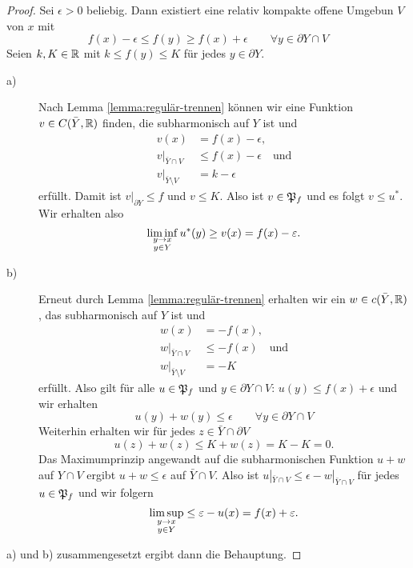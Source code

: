 \begin{proof}
  Sei $\epsilon > 0$ beliebig. Dann existiert eine relativ kompakte offene
  Umgebun $V$ von $x$ mit
  \[
  f(x) - \epsilon \leq f(y) \geq f(x) + \epsilon \qquad \forall y
  \in \partial Y \cap V
  \]
  Seien $k, K \in \mathbb{R}$ mit $k \leq f(y) \leq K$ für jedes $y
  \in \partial Y$.
  \begin{description}
  \item[a)] Nach Lemma \ref{lemma:regulär-trennen} können wir eine
    Funktion $v \in C(\bar Y, \mathbb{R})$ finden, die subharmonisch auf $Y$ ist und
    \begin{align*}
      v(x) & = f(x) - \epsilon, \\
      v|_{\bar Y \cap V} & \leq f(x) - \epsilon \quad \text{und} \\
      v|_{\bar Y \setminus V} & = k - \epsilon
    \end{align*}
    erfüllt. Damit ist $v|_{\partial Y} \leq f$ und $v \leq K$. Also ist $v \in
    \mathfrak{P}_f$ und es folgt $v \leq u^\ast$. Wir erhalten also
    \[
    \liminf_{\substack{y \rightarrow x\\y \in Y}} u^\ast(y) \geq v(x) = f(x) - \varepsilon.
    \]
  \item[b)] Erneut durch Lemma \ref{lemma:regulär-trennen} erhalten
    wir ein $w \in c(\bar Y, \mathbb{R})$, das subharmonisch auf $Y$ ist und
    \begin{align*}
      w(x) & = - f(x), \\
      w|_{\bar Y \cap V} & \leq -f(x) \quad \text{und} \\
      w|_{\bar Y \setminus V}  & = -K
    \end{align*}
    erfüllt. Also gilt für alle $u \in \mathfrak{P}_f$ und $y \in \partial Y \cap V$:
    $u(y) \leq f(x) + \epsilon$ und wir erhalten
    \[
    u(y) + w(y) \leq \epsilon \qquad \forall y \in \partial Y \cap V
    \]
    Weiterhin erhalten wir für jedes $z \in \bar Y \cap \partial V$
    \[
    u(z) + w(z) \leq K + w(z) = K - K  = 0.
    \]
    Das Maximumprinzip angewandt auf die subharmonischen Funktion $u+w$
    auf $Y \cap V$ ergibt $u + w \leq \epsilon $ auf $\bar Y \cap
    V$. Also ist $u|_{\bar Y \cap V} \leq \epsilon - w|_{\bar Y \cap V}$
    für jedes $u \in \mathfrak{P}_f$ und wir folgern
    \[
    \limsup_{\substack{y \rightarrow x\\y \in Y}} \leq \varepsilon - u(x) = f(x)
    + \varepsilon.
    \]
  \end{description}
  a) und b) zusammengesetzt ergibt dann die Behauptung.
\end{proof}

